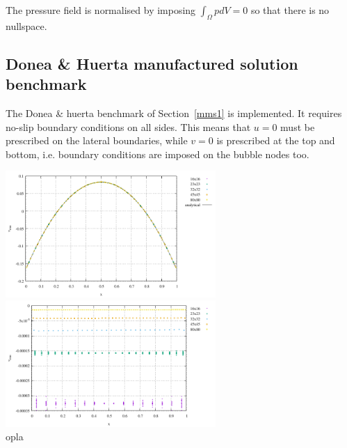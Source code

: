 The pressure field is normalised by imposing $\int_\Omega p dV=0 $ so that there is no nullspace.

\subsection*{Donea \& Huerta manufactured solution benchmark}

The Donea \& huerta benchmark of Section~\ref{mms1} is implemented. It requires 
no-slip boundary conditions on all sides. This means that $u=0$ must be 
prescribed on the lateral boundaries, while $v=0$ is prescribed at the top and bottom, 
i.e. boundary conditions are imposed on the bubble nodes too.

\begin{center}
\includegraphics[width=8cm]{python_codes/fieldstone_80/results/dh/pressure}
\includegraphics[width=8cm]{python_codes/fieldstone_80/results/dh/pressure_error}\\
{\captionfont  opla}
\end{center}


